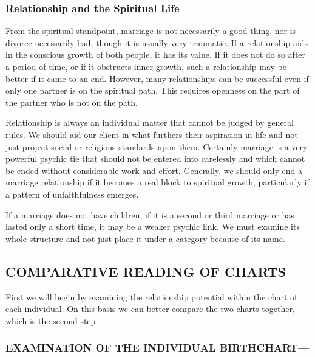  

\subsubsection{Relationship and the Spiritual Life}

 

From the spiritual standpoint, marriage is not necessarily a good thing, nor is divorce necessarily bad, though it is usually very traumatic. If a relationship aids in the conscious growth of both people, it has its value. If it does not do so after a period of time, or if it obstructs inner growth, such a relationship may be better if it came to an end. However, many relationships can be successful even if only one partner is on the spiritual path. This requires openness on the part of the partner who is not on the path.

 

Relationship is always an individual matter that cannot be judged by general rules. We should aid our client in what furthers their aspiration in life and not just project social or religious standards upon them. Certainly marriage is a very powerful psychic tie that should not be entered into carelessly and which cannot be ended without considerable work and effort. Generally, we should only end a marriage relationship if it becomes a real block to spiritual growth, particularly if a pattern of unfaithfulness emerges.

 

If a marriage does not have children, if it is a second or third marriage or has lasted only a short time, it may be a weaker psychic link. We must examine its whole structure and not just place it under a category because of its name.

 

\subsection{COMPARATIVE READING OF CHARTS}
First we will begin by examining the relationship potential within the chart of each individual. On this basis we can better compare the two charts together, which is the second step.

 

\subsubsection{EXAMINATION OF THE INDIVIDUAL BIRTHCHART—}
 

